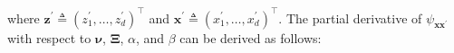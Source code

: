 \documentclass[conference]{IEEEtran}
\begin{document}
	where $\mathbf{z}^\prime \triangleq (z^\prime_1,\ldots,z^\prime_d)^\top$ and $\mathbf{x}^\prime \triangleq (x^\prime_1,\ldots,x^\prime_d)^\top$.
	The partial derivative of $\psi_\mathbf{xx^\prime}$ with respect to $\boldsymbol{\nu}$, $\mathbf{\Xi}$, $\alpha$, and $\beta$ can be derived as follows:
\end{document}

